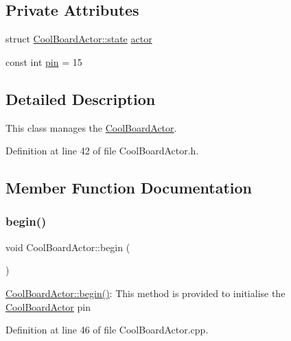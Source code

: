 \subsection*{Private Attributes}
\begin{DoxyCompactItemize}
\item 
struct \hyperlink{struct_cool_board_actor_1_1state}{Cool\+Board\+Actor\+::state} \hyperlink{class_cool_board_actor_a8f190db9f7a39fddbcef7f152da970e9}{actor}
\item 
const int \hyperlink{class_cool_board_actor_a8b5c0b41fe6033b68d9e1ed00bc2e122}{pin} = 15
\end{DoxyCompactItemize}


\subsection{Detailed Description}
This class manages the \hyperlink{class_cool_board_actor}{Cool\+Board\+Actor}. 

Definition at line 42 of file Cool\+Board\+Actor.\+h.



\subsection{Member Function Documentation}
\mbox{\label{class_cool_board_actor_a7f4422fd85a5510bc2cdfd68e109be5e}} 
\subsubsection{\texorpdfstring{begin()}{begin()}}
{\footnotesize\ttfamily void Cool\+Board\+Actor\+::begin (\begin{DoxyParamCaption}{ }\end{DoxyParamCaption})}

\hyperlink{class_cool_board_actor_a7f4422fd85a5510bc2cdfd68e109be5e}{Cool\+Board\+Actor\+::begin()}\+: This method is provided to initialise the \hyperlink{class_cool_board_actor}{Cool\+Board\+Actor} pin 

Definition at line 46 of file Cool\+Board\+Actor.\+cpp.


